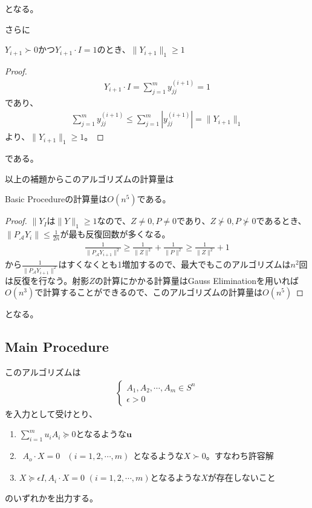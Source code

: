となる。

さらに
\begin{lemma*}
  $Y_{i + 1} \succ 0$かつ$Y_{i + 1} \cdot I = 1$のとき、$\|Y_{i + 1}\|_1 \geq 1$
\end{lemma*}
\begin{proof}
  \begin{align*}
    Y_{i + 1} \cdot I = \displaystyle{\sum_{j = 1}^m y_{j j}^{(i + 1)}} = 1
  \end{align*}
  であり、
  \begin{align*}
    \displaystyle{\sum_{j = 1}^m y_{j j}^{(i + 1)}} \leq \displaystyle{\sum_{j = 1}^m |y_{j j}^{(i + 1)}|} = \|Y_{i + 1}\|_1
  \end{align*}
  より、$\|Y_{i + 1}\|_1 \geq 1$。
\end{proof}
である。

以上の補題からこのアルゴリズムの計算量は
\begin{theorem} \label{BasicProcedureOrder}
  Basic Procedureの計算量は$O (n^5)$である。
\end{theorem}
\begin{proof}
  $\|Y_I$は$\|Y\|_1 \geq 1$なので、$Z \not= 0, P \not= 0$であり、$Z \not\succ 0, P \not\succ 0$であるとき、$\|P_\mathcal{A} Y_i\| \leq \displaystyle{\frac{1}{2 n}}$が最も反復回数が多くなる。
  \begin{align*}
    \frac{1}{\|P_\mathcal{A} Y_{i + 1}\|^2} \geq \frac{1}{\|Z\|^2} + \frac{1}{\|P\|^2} \geq \frac{1}{\|Z\|^2} + 1
  \end{align*}
  から$\displaystyle{\frac{1}{\|P_\mathcal{A} Y_{i + 1}\|^2}}$はすくなくとも1増加するので、最大でもこのアルゴリズムは$n^2$回は反復を行なう。射影$Z$の計算にかかる計算量はGauss Eliminationを用いれば$O (n^3)$で計算することができるので、このアルゴリズムの計算量は$O(n^5)$
\end{proof}
となる。

\subsection{Main Procedure}
このアルゴリズムは
\begin{align*}
  \left\{
    \begin{array}{l}
      A_1, A_2, \cdots, A_m \in S^n \\
      \epsilon > 0
    \end{array}
  \right.
\end{align*}
を入力として受けとり、
\begin{enumerate}[label=(\alph*)]
  \item $\displaystyle{\sum_{i = 1}^m u_i A_i \succeq 0}$となるような$\mathbf{u}$ \label{DualSolution}
  \item $\begin{array}{ll} A_o \cdot X = 0 & (i = 1, 2, \cdots, m) \end{array}$となるような$X \succ 0$。すなわち許容解 \label{FeasibleSolution}
  \item $X \succeq \epsilon I, A_i \cdot X = 0 \,\, (i = 1, 2, \cdots, m)$となるような$X$が存在しないこと \label{NoSolution}
\end{enumerate}
のいずれかを出力する。

